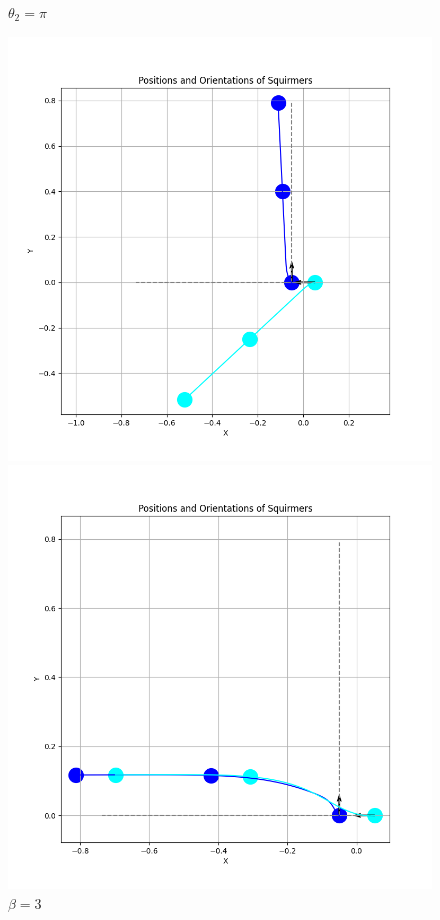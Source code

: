 \documentclass{article}
\begin{document}
\begin{figure}[H]
    \centering
    \textbf{$\theta_2 = \pi$}\par\medskip
    \begin{minipage}{0.49\textwidth}
        \includegraphics[width=1.1\textwidth]{graphs/simulations/sim_sq_sq/betam3/pi_.png}
        \caption{\footnotesize $\beta = -3$}
    \end{minipage}\hfill
    \begin{minipage}{0.49\textwidth}
        \includegraphics[width=1.1\textwidth]{graphs/simulations/sim_sq_sq/beta3/pi_.png}
        \caption{\footnotesize $\beta = 3$}
    \end{minipage}
\end{figure}
\end{document}
